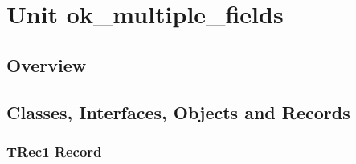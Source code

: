 \documentclass{report}
\newif\ifpdf
\begin{document}
\label{toc}\tableofcontents
\newpage
\newlength{\tmplength}
\chapter{Unit ok{\_}multiple{\_}fields}
\label{ok_multiple_fields}
\section{Overview}
\begin{description}
\item[\texttt{\begin{ttfamily}TRec1\end{ttfamily} Record}]
\item[\texttt{\begin{ttfamily}TRec2\end{ttfamily} Record}]
\end{description}
\section{Classes, Interfaces, Objects and Records}
\ifpdf
\subsection*{\large{\textbf{TRec1 Record}}\normalsize\hspace{1ex}\hrulefill}
\else
\subsection*{TRec1 Record}
\fi
\label{ok_multiple_fields.TRec1}
\end{document}

